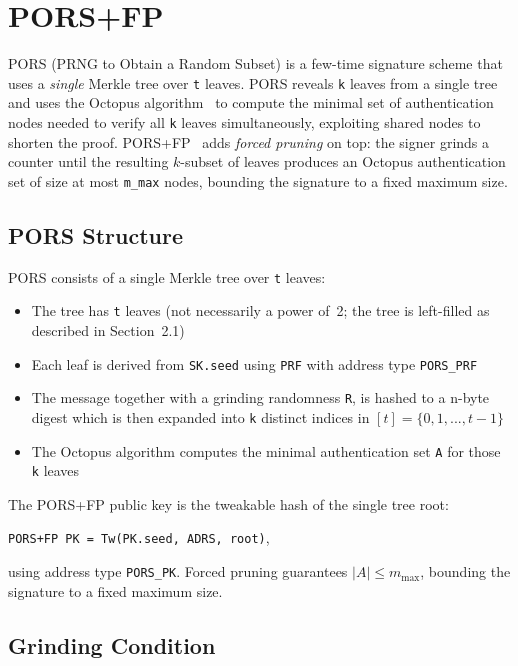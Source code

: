 \section{PORS+FP}
PORS (PRNG to Obtain a Random Subset) is a few-time signature scheme that uses a \emph{single} Merkle tree over \texttt{t}
leaves. PORS reveals \texttt{k} leaves from a single tree and uses the Octopus algorithm~\cite{pors_octopus2018} to compute the minimal
set of authentication nodes needed to verify all \texttt{k} leaves simultaneously,
exploiting shared nodes to shorten the proof. PORS+FP~\cite{pors_fp2025} adds
\emph{forced pruning} on top: the signer grinds a counter until the resulting
$k$-subset of leaves produces an Octopus authentication set of size at most
\texttt{m\_max} nodes, bounding the signature to a fixed maximum size.

\subsection{PORS Structure}
 
PORS consists of a single Merkle tree over \texttt{t} leaves:
\begin{itemize}
    \item The tree has \texttt{t} leaves (not necessarily a power of~2; the tree is
          left-filled as described in Section~2.1)
    \item Each leaf is derived from \texttt{SK.seed} using \texttt{PRF} with address
          type \texttt{PORS\_PRF}
    \item The message together with a grinding randomness \texttt{R},
          is hashed to a n-byte digest which is then expanded into \texttt{k} distinct
          indices in $[t] = \{0,1,...,t-1\}$
    \item The Octopus algorithm computes the minimal authentication set \texttt{A} for those
          \texttt{k} leaves
\end{itemize}
 
The PORS+FP public key is the tweakable hash of the single tree root:
\begin{center}
    \texttt{PORS+FP PK = Tw(PK.seed, ADRS, root)},
\end{center}
using address type \texttt{PORS\_PK}. Forced pruning guarantees
$|A| \le m_{\max}$, bounding the signature to a fixed maximum size.

\subsection{Grinding Condition}
\label{subsec:pors_grind_condition}
 
